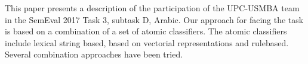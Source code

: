 This paper presents a description of the participation of the UPC-USMBA team in the SemEval 2017 Task 3, subtask D, Arabic. Our approach for facing the task is based on a combination of a set of atomic classifiers. The atomic classifiers include lexical string based, based on vectorial representations and rulebased. Several combination approaches have been tried.
